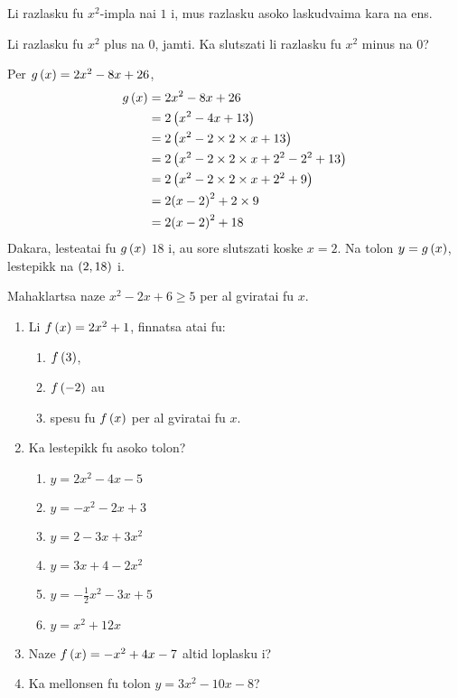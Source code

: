 Li razlasku fu \(x^2\)-impla nai \(1\) i, mus  razlasku
asoko laskudvaima kara na ens.

\begin{remark}
	Li razlasku fu \(x^2\) plus na \(0\),  jamti. Ka slutszati
	li razlasku fu \(x^2\) minus na \(0\)?
\end{remark}

\begin{example}
	Per \(g\left(x\right) = 2x^2 - 8x + 26\),
	\begin{align*}
		g\left(x\right) & = 2x^2 - 8x + 26                                   \\
		        & = 2\left(x^2 - 4x + 13\right)                              \\
		        & = 2\left(x^2 - 2 \times 2 \times x + 13\right)             \\
		        & = 2\left(x^2 - 2 \times 2 \times x + 2^2 - 2^2 + 13\right) \\
		        & = 2\left(x^2 - 2 \times 2 \times x + 2^2 + 9\right)        \\
		        & = 2{\left(x - 2\right)}^2 + 2 \times 9                     \\
		        & = 2{\left(x - 2\right)}^2 + 18                             \\
	\end{align*}
	Dakara, lesteatai fu \(g\left(x\right)\) \(18\) i, au sore slutszati koske
	\(x = 2\). Na tolon \(y = g\left(x\right)\), lestepikk na \(\left(2, 18\right)\) i.
\end{example}

\begin{problem}
Mahaklartsa naze \(x^2 - 2x + 6 \geq 5\)
per al gviratai fu \(x\).
\end{problem}

\begin{exercise}
	\begin{enumerate}
		\item Li \(f\left(x\right) = 2x^2 + 1\), finnatsa atai fu:
		      \begin{enumerate}
			      \item \(f\left(3\right)\),
			      \item \(f\left(-2\right)\) au
			      \item spesu fu \(f\left(x\right)\) per al gviratai fu \(x\).
		      \end{enumerate}
		\item Ka lestepikk fu asoko tolon?
		      \begin{enumerate}
			      \item \(y = 2x^2 - 4x - 5\)
			      \item \(y = -x^2 - 2x + 3\)
			      \item \(y = 2 - 3x + 3x^2\)
			      \item \(y = 3x + 4 - 2x^2\)
			      \item \(y = -\frac{1}{2}x^2 - 3x + 5\)
			      \item \(y = x^2 + 12x\)
		      \end{enumerate}
		\item Naze \(f\left(x\right) = -x^2 + 4x - 7\) altid loplasku i?
		\item Ka mellonsen fu tolon \(y = 3x^2 - 10x - 8\)?
	\end{enumerate}
\end{exercise}
